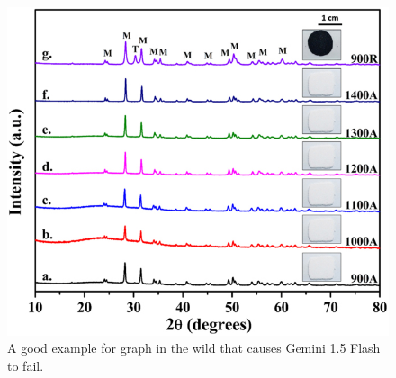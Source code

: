 \documentclass[
	letterpaper, %
]{jdf}
\begin{document}
   
   
   
\begin{figure}
   \includegraphics{test-sample/icpr22/images/line/PMC5882956___1_HTML.jpg}
   \caption{A good example for graph in the wild that causes Gemini 1.5 Flash to fail.}
   \label{fig:icpr22-line-5882}
   \end{figure}

\end{document}
